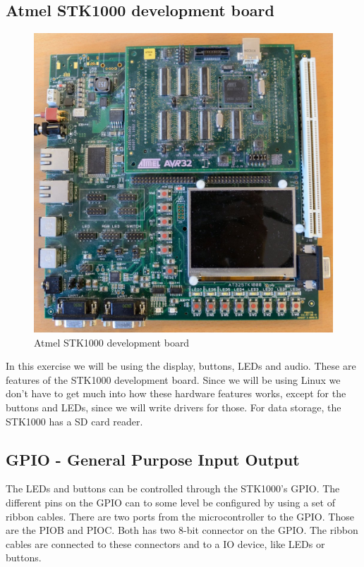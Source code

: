 \documentclass[12pt,a4paper,final]{report}
\numberwithin{equation}{section}
\numberwithin{table}{section}
\numberwithin{figure}{section}
\begin{document}
\subsection{Atmel STK1000 development board}
\label{sec:stk1000}
\begin{figure}[H]
\centering
\includegraphics[scale=1.5]{stk1000photo}
\caption{Atmel STK1000 development board}
\label{fig:stk1000}
\end{figure}

In this exercise we will be using the display, buttons, LEDs and audio. These are features of the STK1000 development board. Since we will be using Linux we don’t have to get much into how these hardware features works, except for the buttons and LEDs, since we will write drivers for those. For data storage, the STK1000 has a SD card reader.

\subsection{GPIO - General Purpose Input Output}
\label{sec:gpio}

The LEDs and buttons can be controlled through the STK1000’s GPIO. The different pins on the GPIO can to some level be configured by using a set of ribbon cables. There are two ports from the microcontroller to the GPIO. Those are the PIOB and PIOC. Both has two 8-bit connector on the GPIO. The ribbon cables are connected to these connectors and to a IO device, like LEDs or buttons.
\end{document}
